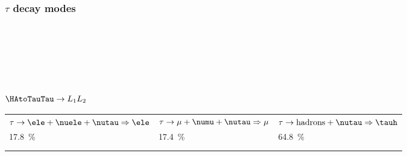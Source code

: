 \begin{frame}
\frametitle{$\tau$ decay modes}
\vspace{-\baselineskip}

~\hfill
\pause
\hfill
\pause
\hfill~

\vspace{4\baselineskip}

~\hfill

\hfill

\hfill~
\end{frame}

\begin{frame}
\frametitle{$\HAtoTauTau\to L_1L_2$}

{\small
\begin{tabularx}{\linewidth}{YYY}
$\tau\to\ele+\nuele+\nutau\Rightarrow\ele$ & $\tau\to\mu+\numu+\nutau\Rightarrow\mu$ & $\tau\to\text{hadrons}+\nutau\Rightarrow\tauh$\\
\SI{17.8}{\%} & \SI{17.4}{\%} & \SI{64.8}{\%}\\
\\

&

&

\end{tabularx}
}

\pause

\begin{minipage}[c]{.45\textwidth}
\begin{center}

\end{center}
\end{minipage}
\hfill\pause
\begin{minipage}[c]{.45\textwidth}
\begin{center}

\end{center}
\end{minipage}

\vspace{-\baselineskip}

\end{frame}

